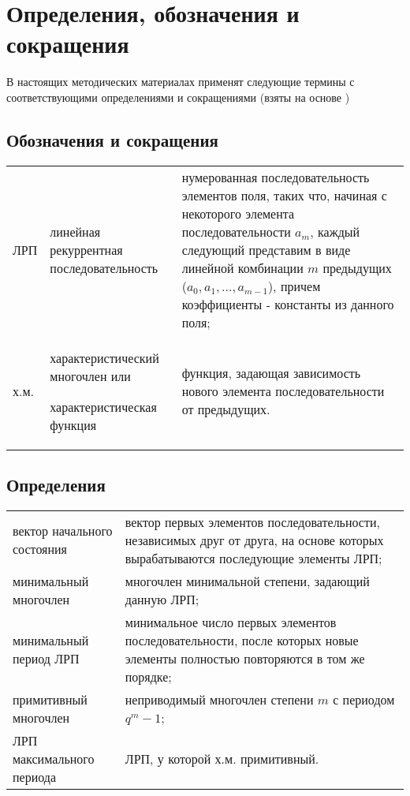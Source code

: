 \documentclass[utf8x, 14pt]{G7-32} %
\begin{document}
\frontmatter %

\maketitle %


\begin{executors}
\end{executors}

\tableofcontents
 
\chapter{Определения, обозначения и сокращения}
В настоящих методических материалах применят следующие термины с соответствующими определениями и сокращениями (взяты на основе \cite{LRS_additional})
\section{Обозначения и сокращения}
\begin{center}   
\begin{tabular}{ p{}  p{} p{} }
 ЛРП & линейная рекуррентная последовательность  & нумерованная последовательность элементов поля, таких что, начиная с некоторого элемента последовательности $a_m$, каждый следующий представим в виде линейной комбинации $m$ предыдущих ($a_0, a_1, ..., a_{m-1}$), причем коэффициенты - константы из данного поля; \\ 
  х.м. &  характеристический многочлен или \par характеристическая функция  & функция, задающая зависимость нового элемента последовательности от предыдущих. \\
 \end{tabular}
 \end{center} 
 
 \section{Определения}
 \begin{center}   
\begin{tabular}{ p{}  p{} }   
  вектор начального состояния  & вектор первых элементов последовательности, независимых друг от друга, на основе которых вырабатываются последующие элементы ЛРП; \\ 
  минимальный многочлен & многочлен минимальной степени, задающий данную ЛРП; \\  
  минимальный период ЛРП & минимальное число первых элементов последовательности, после которых новые элементы полностью повторяются в том же порядке; \\
  примитивный многочлен & неприводимый многочлен степени $m$ с периодом $q^m - 1$; \\
  ЛРП максимального периода & ЛРП, у которой х.м. примитивный. \\ 
\end{tabular}   
\end{center}
\end{document}

